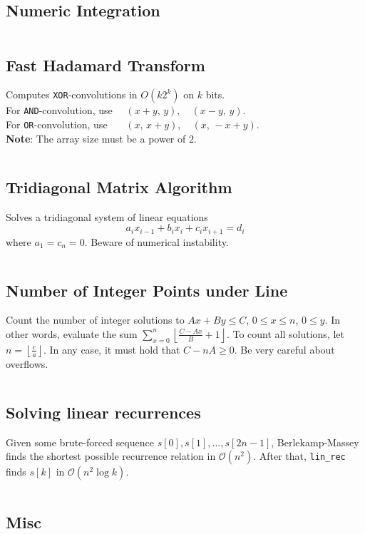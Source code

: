 \documentclass[8pt,a4paper,landscape,oneside]{amsart}
\newcommand{\mintedstyle}[2]{\inputminted[fontsize=\normalsize,baselinestretch=.9,breaklines,breakautoindent,tabsize=2]{#1}{code/#2}}
\newcommand{\code}[1]{\mintedstyle{cpp}{#1}}
\newif\ifverbose
\begin{document}
\begin{multicols*}{3}
\subsection{Numeric Integration}
\ifverbose
Numeric integration using Simpson's rule.
\fi
\code{math/numeric_integration.cpp}

\subsection{Fast Hadamard Transform}
Computes \texttt{XOR}-convolutions in $O(k 2^k)$ on $k$ bits. \\
For \texttt{AND}-convolution, use $\quad  (x + y, \, y), \quad (x-y, \, y)$. \\
For \texttt{OR}-convolution, use $\quad\,\,\, (x, \, x + y), \quad (x, \, -x + y)$. \\
\textbf{Note}: The array size must be a power of $2$.
\code{math/fht.cpp}

\subsection{Tridiagonal Matrix Algorithm}

Solves a tridiagonal system of linear equations \[ a_i x_{i-1} + b_i x_i + c_i x_{i+1} = d_i \] where $a_1 = c_n = 0$.
Beware of numerical instability.
\code{math/tridiagonal.cpp}

\subsection{Number of Integer Points under Line}
Count the number of integer solutions to $Ax+By\leq C$, $0 \leq x \leq
n$, $0 \leq y$. In other words, evaluate the sum $\sum_{x=0}^n
\left\lfloor \frac{C-Ax}{B} + 1\right\rfloor$. To count all solutions,
let $n = \left\lfloor \frac{c}{a}\right\rfloor$. In any case, it must hold
that $C-nA \geq 0$. Be very careful about overflows.
\code{math/floor_sum.cpp}

\subsection{Solving linear recurrences}
Given some brute-forced sequence $s[0], s[1], \dots, s[2n-1]$, Berlekamp-Massey finds the shortest possible recurrence relation in $\mathcal{O}(n^2)$.
After that, \texttt{lin\_rec} finds $s[k]$ in $\mathcal{O}(n^2 \log k)$.
\code{other/berlekamp-massey.cpp}

\subsection{Misc}


\end{multicols*}
\end{document}
